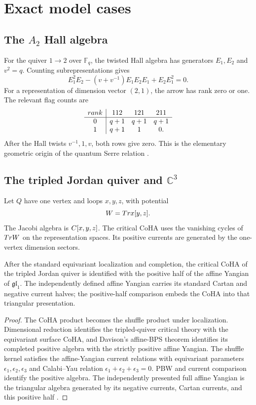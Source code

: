 \part{Exact model cases}

\chapter{The \texorpdfstring{$A_2$}{A2} Hall algebra}
For the quiver $1\to2$ over $\mathbb F_q$, the twisted Hall algebra has generators $E_1,E_2$ and $v^2=q$. Counting subrepresentations gives
\[
 E_1^2E_2-(v+v^{-1})E_1E_2E_1+E_2E_1^2=0.
\]
For a representation of dimension vector $(2,1)$, the arrow has rank zero or one. The relevant flag counts are
\[
\begin{array}{c|ccc}
rank&112&121&211\\ \hline
0&q+1&q+1&q+1\\
1&q+1&1&0.
\end{array}
\]
After the Hall twists $v^{-1},1,v$, both rows give zero. This is the elementary geometric origin of the quantum Serre relation \cite{Ringel,Green}.

\chapter{The tripled Jordan quiver and \texorpdfstring{$\mathbb C^3$}{C3}}
Let $Q$ have one vertex and loops $x,y,z$, with potential
\[
 W=Tr x[y,z].
\]
The Jacobi algebra is $C[x,y,z]$. The critical CoHA uses the vanishing cycles of $Tr W$ on the representation spaces. Its positive currents are generated by the one-vertex dimension sectors.

\begin{theorem}
After the standard equivariant localization and completion, the critical CoHA of the tripled Jordan quiver is identified with the positive half of the affine Yangian of $\mathfrak{gl}_1$. The independently defined affine Yangian carries its standard Cartan and negative current halves; the positive-half comparison embeds the CoHA into that triangular presentation.
\end{theorem}
\begin{proof}
The CoHA product becomes the shuffle product under localization. Dimensional reduction identifies the tripled-quiver critical theory with the equivariant surface CoHA, and Davison's affine-BPS theorem identifies its completed positive algebra with the strictly positive affine Yangian. The shuffle kernel satisfies the affine-Yangian current relations with equivariant parameters $\epsilon_1,\epsilon_2,\epsilon_3$ and Calabi--Yau relation $\epsilon_1+\epsilon_2+\epsilon_3=0$. PBW and current comparison identify the positive algebra. The independently presented full affine Yangian is the triangular algebra generated by its negative currents, Cartan currents, and this positive half \cite{DavisonAffineBPS,DavisonMeinhardt,SVYangians,Tsymbaliuk}.
\end{proof}

